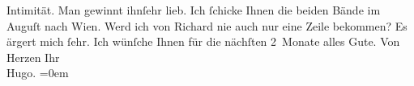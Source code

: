\begin{ledgroupsized}[t]{13cm}
               Intimität. Man gewinnt ihnſehr lieb. Ich ſchicke Ihnen die beiden Bände im
                  Auguſt nach Wien.\pend
           \pstart
           {\pb}Werd ich von Richard nie auch nur eine Zeile bekommen?\pend
           \pstart
           Es ärgert mich ſehr.\pend
           \pstart
           Ich wünſche Ihnen für die nächſten 2 Monate alles Gute.\pend
           \pstart
           Von Herzen Ihr{\\[\baselineskip]}\spacefill\mbox{Hugo.}\pend
           \leftskip=0em{}
         
         \endnumbering{}\end{ledgroupsized}  \newcommand{\dateiname}{L00706}\newcommand{\titel}{Hugo von Hofmannsthal an Arthur Schnitzler, [19. 7. 1897]}\newcommand{\editorInnen}{Martin Anton Müller und Gerd-Hermann Susen}
      